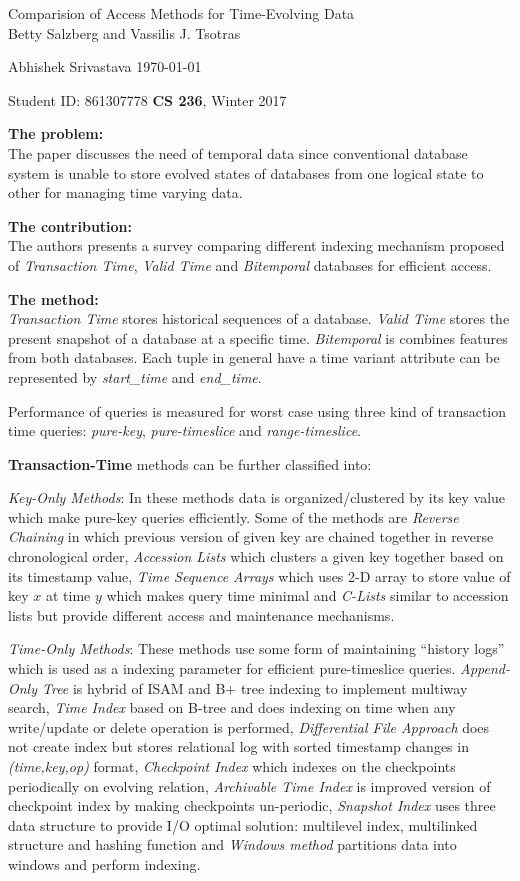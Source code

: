 \documentclass[a4paper,11pt, twoside]{article}
\renewcommand{\maketitle}{%
 	\Large
 	\begin{center}
 	Comparision of Access Methods for Time-Evolving Data\\	
 	\normalsize Betty Salzberg and Vassilis J. Tsotras
 	\end{center}
 
 	\Large
	Abhishek Srivastava
	\hfill
	\normalsize
	\today
 	\par
 	Student ID: 861307778
 	\hfill
 	\textbf{CS 236}, Winter 2017
 	\par 	
 	\hrulefill
 	\par
 	}
\begin{document}
\thispagestyle{empty}
	
\maketitle
\textbf{The problem:}\\
The paper discusses the need of temporal data since conventional database system is unable to store evolved states of databases from one logical state to other for managing time varying data.  

\textbf{The contribution:}\\
The authors presents a survey comparing different indexing mechanism proposed  of \emph{Transaction Time}, \emph{Valid Time} and \emph{Bitemporal} databases for efficient access.

\textbf{The method:}\\
\emph{Transaction Time} stores historical sequences of a database. \emph{Valid Time} stores the present snapshot of a database at a specific time. \emph{Bitemporal} is combines features from both databases. Each tuple in general have a time variant attribute can be represented by \emph{start\_time} and \emph{end\_time}.
 
Performance of queries is measured for worst case using three kind of transaction time queries: \emph{pure-key}, \emph{pure-timeslice} and \emph{range-timeslice}.

\noindent
\textbf{Transaction-Time} methods can be further classified into:

\emph{Key-Only Methods}: In these methods data is organized/clustered by its key value which make pure-key queries efficiently. Some of the methods are \emph{Reverse Chaining} in which previous version of given key are chained together in reverse chronological order, \emph{Accession Lists} which clusters a given key together based on its timestamp value, \emph{Time Sequence Arrays} which uses 2-D array to store value of key $x$ at time $y$ which makes query time minimal and \emph{C-Lists} similar to accession lists but provide different access and maintenance mechanisms.

\emph{Time-Only Methods}: These methods use some form of maintaining ``history logs'' which is used as a indexing parameter for efficient pure-timeslice queries. \emph{Append-Only Tree} is hybrid of ISAM and B+ tree indexing to implement multiway search, \emph{Time Index} based on B-tree and does indexing on time when any write/update or delete operation is performed, \emph{Differential File Approach} does not create index but stores relational log with sorted timestamp changes in \emph{(time,key,op)} format, \emph{Checkpoint Index} which indexes on the checkpoints periodically on evolving relation, \emph{Archivable Time Index} is improved version of checkpoint index by making checkpoints un-periodic, \emph{Snapshot Index} uses three data structure to provide I/O optimal solution: multilevel index, multilinked structure and hashing function and \emph{Windows method} partitions data into windows and perform indexing. 
\end{document}
